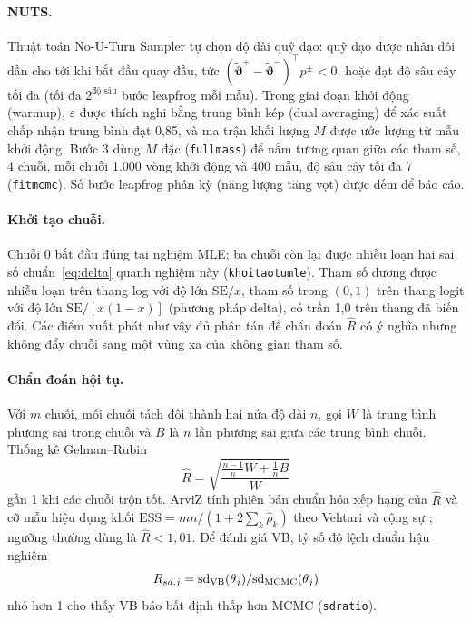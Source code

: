 \documentclass[11pt,a4paper]{article}
\renewcommand{\_}{\gachduoi\allowbreak}
\newcommand{\tep}[1]{\texttt{#1}}
\newcommand{\ham}[1]{\texttt{#1}}
\newcommand{\btheta}{\boldsymbol\vartheta}
\begin{document}
\paragraph{NUTS.} Thuật toán No-U-Turn Sampler \cite{hoffman2014nuts} tự chọn độ dài quỹ đạo: quỹ đạo được nhân đôi dần cho tới khi bắt đầu quay đầu, tức $(\tilde{\btheta}^+-\tilde{\btheta}^-)^{\!\top}p^{\pm}<0$, hoặc đạt độ sâu cây tối đa (tối đa $2^{\text{độ sâu}}$ bước leapfrog mỗi mẫu). Trong giai đoạn khởi động (warmup), $\varepsilon$ được thích nghi bằng trung bình kép (dual averaging) để xác suất chấp nhận trung bình đạt 0,85, và ma trận khối lượng $M$ được ước lượng từ mẫu khởi động. Bước 3 dùng $M$ đặc (\tep{full\_mass}) để nắm tương quan giữa các tham số, 4 chuỗi, mỗi chuỗi 1.000 vòng khởi động và 400 mẫu, độ sâu cây tối đa 7 (\ham{fit\_mcmc}). Số bước leapfrog phân kỳ (năng lượng tăng vọt) được đếm để báo cáo.

\paragraph{Khởi tạo chuỗi.} Chuỗi 0 bắt đầu đúng tại nghiệm MLE; ba chuỗi còn lại được nhiễu loạn hai sai số chuẩn~\eqref{eq:delta} quanh nghiệm này (\ham{khoi\_tao\_tu\_mle}). Tham số dương được nhiễu loạn trên thang log với độ lớn $\mathrm{SE}/x$, tham số trong $(0,1)$ trên thang logit với độ lớn $\mathrm{SE}/[x(1-x)]$ (phương pháp delta), có trần 1,0 trên thang đã biến đổi. Các điểm xuất phát như vậy đủ phân tán để chẩn đoán $\hat R$ có ý nghĩa nhưng không đẩy chuỗi sang một vùng xa của không gian tham số.

\paragraph{Chẩn đoán hội tụ.} Với $m$ chuỗi, mỗi chuỗi tách đôi thành hai nửa độ dài $n$, gọi $W$ là trung bình phương sai trong chuỗi và $B$ là $n$ lần phương sai giữa các trung bình chuỗi. Thống kê Gelman–Rubin \cite{gelman1992}
\begin{equation}
\hat R=\sqrt{\frac{\frac{n-1}{n}W+\frac1nB}{W}}
\end{equation}
gần 1 khi các chuỗi trộn tốt. ArviZ tính phiên bản chuẩn hóa xếp hạng của $\hat R$ và cỡ mẫu hiệu dụng khối $\mathrm{ESS}=mn/(1+2\sum_{k}\hat\rho_k)$ theo Vehtari và cộng sự \cite{vehtari2021rhat}; ngưỡng thường dùng là $\hat R<1{,}01$. Để đánh giá VB, tỷ số độ lệch chuẩn hậu nghiệm
\begin{equation}
R_{sd,j}=\mathrm{sd}_{\rm VB}(\theta_j)/\mathrm{sd}_{\rm MCMC}(\theta_j)
\end{equation}
nhỏ hơn 1 cho thấy VB báo bất định thấp hơn MCMC (\ham{sd\_ratio}).
\end{document}
